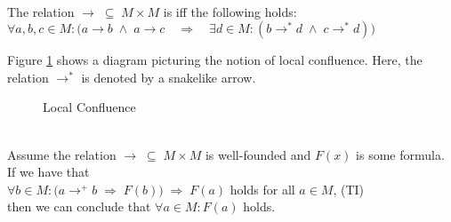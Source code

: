 \begin{Definition} \hspace*{\fill} \\
  The relation $\rightarrow \;\subseteq\; M \times M$ is  iff the following holds:
  \\[0.2cm]
  \hspace*{1.3cm}
  $\forall a, b, c \in M: \bigl(a \rightarrow b \;\wedge\; a \rightarrow c \quad\Rightarrow\quad
   \exists d \in M: (b \rightarrow^* d \;\wedge\; c \rightarrow^* d)\bigr)
  $  \eox
\end{Definition}

\noindent
Figure \ref{fig:local-confluence.tikz} shows a diagram picturing the notion of local confluence.
Here, the relation $\rightarrow^*$ is denoted by a snakelike arrow.
\begin{figure}[!ht]
    \centering
    \caption{Local Confluence}
    \label{fig:local-confluence.tikz}
\end{figure}

\begin{Theorem}
  \hspace*{\fill} \\
  Assume the relation $\rightarrow \;\subseteq\; M \times M$ is well-founded and $F(x)$ is some formula.
  If we have that
  \\[0.2cm]
  \hspace*{1.3cm}
  $\forall b \in M: \bigl( a \rightarrow^+ b \;\Rightarrow\; F(b)\bigr) \;\Rightarrow\; F(a)$ holds for all $a \in M$, \hspace*{\fill} (TI)
  \\[0.2cm]
  then we can conclude that $\forall a \in M: F(a)$ holds.
\end{Theorem}


